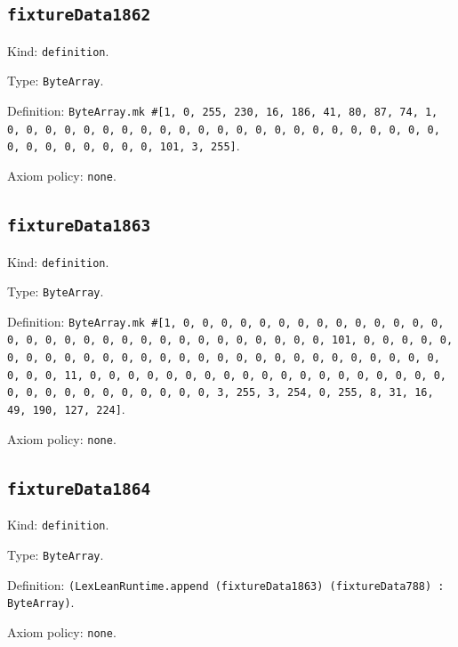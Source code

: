 \documentclass[11pt]{article}
\begin{document}
\subsection*{\texttt{fixtureData1862}}
\noindent Kind: \texttt{definition}.\par
\noindent Type: \texttt{ByteArray}.\par
\noindent Definition: \texttt{ByteArray.mk \#[1, 0, 255, 230, 16, 186, 41, 80, 87, 74, 1, 0, 0, 0, 0, 0, 0, 0, 0, 0, 0, 0, 0, 0, 0, 0, 0, 0, 0, 0, 0, 0, 0, 0, 0, 0, 0, 0, 0, 0, 0, 0, 101, 3, 255]}.\par
\noindent Axiom policy: \texttt{none}.\par
\subsection*{\texttt{fixtureData1863}}
\noindent Kind: \texttt{definition}.\par
\noindent Type: \texttt{ByteArray}.\par
\noindent Definition: \texttt{ByteArray.mk \#[1, 0, 0, 0, 0, 0, 0, 0, 0, 0, 0, 0, 0, 0, 0, 0, 0, 0, 0, 0, 0, 0, 0, 0, 0, 0, 0, 0, 0, 0, 0, 0, 101, 0, 0, 0, 0, 0, 0, 0, 0, 0, 0, 0, 0, 0, 0, 0, 0, 0, 0, 0, 0, 0, 0, 0, 0, 0, 0, 0, 0, 0, 0, 0, 11, 0, 0, 0, 0, 0, 0, 0, 0, 0, 0, 0, 0, 0, 0, 0, 0, 0, 0, 0, 0, 0, 0, 0, 0, 0, 0, 0, 0, 0, 0, 3, 255, 3, 254, 0, 255, 8, 31, 16, 49, 190, 127, 224]}.\par
\noindent Axiom policy: \texttt{none}.\par
\subsection*{\texttt{fixtureData1864}}
\noindent Kind: \texttt{definition}.\par
\noindent Type: \texttt{ByteArray}.\par
\noindent Definition: \texttt{(LexLeanRuntime.append (fixtureData1863) (fixtureData788) : ByteArray)}.\par
\noindent Axiom policy: \texttt{none}.\par
\end{document}
